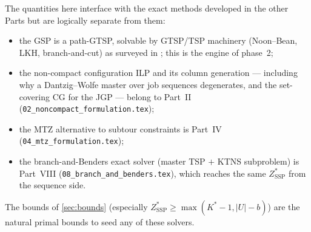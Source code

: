 \documentclass[11pt,a4paper]{article}
\theoremstyle{plain}
\theoremstyle{definition}
\newcommand{\Kstar}{K^{*}}
\newcommand{\ZSSP}{Z_{\mathrm{SSP}}^{*}}
\begin{document}
The quantities here interface with the exact methods developed in the other Parts but are
logically separate from them:
\begin{itemize}
\item the GSP is a path-GTSP, solvable by GTSP/TSP machinery (Noon--Bean, LKH,
branch-and-cut) as surveyed in \cite{Pop2024}; this is the engine of phase~2;
\item the non-compact configuration ILP and its column generation --- including why a
Dantzig--Wolfe master over job sequences degenerates, and the set-covering CG for the JGP
--- belong to Part~II (\texttt{02\_noncompact\_formulation.tex});
\item the MTZ alternative to subtour constraints is Part~IV
(\texttt{04\_mtz\_formulation.tex});
\item the branch-and-Benders exact solver (master TSP $+$ KTNS subproblem) is Part~VIII
(\texttt{08\_branch\_and\_benders.tex}), which reaches the same $\ZSSP$ from the sequence side.
\end{itemize}
The bounds of \cref{sec:bounds} (especially $\ZSSP\ge\max(\Kstar-1,|U|-b)$) are the
natural primal bounds to seed any of these solvers.



\end{document}
